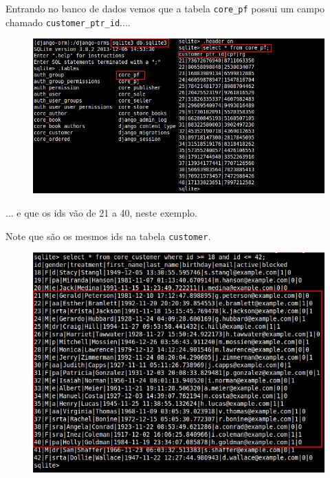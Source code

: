 \documentclass{beamer}
\begin{document}
{\begin{frame}
\end{frame}

\begin{frame}
	
Entrando no banco de dados vemos que a tabela \texttt{core\_pf} possui um campo chamado \texttt{customer\_ptr\_id}....

	\begin{figure}[h]
	  \centering
  		\includegraphics[height=.7\paperheight]{img/core_pf}
	\end{figure}

... e que os ids vão de 21 a 40, neste exemplo.
\end{frame}

\begin{frame}
Note que são os mesmos ids na tabela \texttt{customer}.

	\begin{figure}[h]
	  \centering
  		\includegraphics[height=.7\paperheight]{img/customer_table}
	\end{figure}


\end{frame}}
\end{document}
